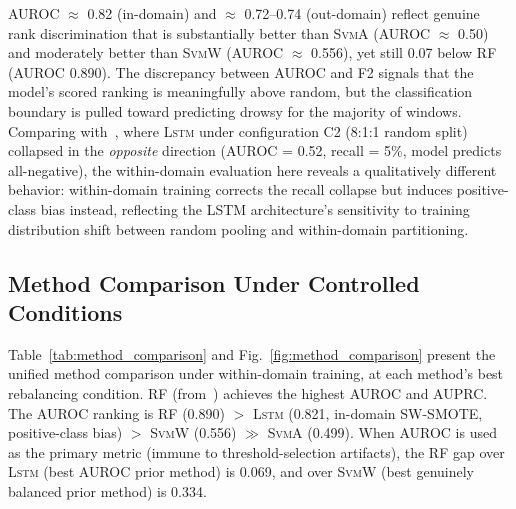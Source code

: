 \documentclass[lettersize,journal]{IEEEtran}
\newcommand{\Impl}[1]{\textsc{#1}}
\begin{document}
AUROC $\approx$ 0.82 (in-domain) and $\approx$ 0.72--0.74 (out-domain) reflect genuine rank discrimination that is substantially better than \Impl{SvmA} (AUROC $\approx$ 0.50) and moderately better than \Impl{SvmW} (AUROC $\approx$ 0.556), yet still 0.07 below RF (AUROC 0.890).
The discrepancy between AUROC and F2 signals that the model's scored ranking is meaningfully above random, but the classification boundary is pulled toward predicting drowsy for the majority of windows.
Comparing with~\cite{nakagama2025iv}, where \Impl{Lstm} under configuration C2 (8:1:1 random split) collapsed in the \emph{opposite} direction (AUROC = 0.52, recall = 5\%, model predicts all-negative), the within-domain evaluation here reveals a qualitatively different behavior: within-domain training corrects the recall collapse but induces positive-class bias instead, reflecting the LSTM architecture's sensitivity to training distribution shift between random pooling and within-domain partitioning.

\subsection{Method Comparison Under Controlled Conditions}
\label{sec:comparison}

Table~\ref{tab:method_comparison} and Fig.~\ref{fig:method_comparison} present the unified method comparison under within-domain training, at each method's best rebalancing condition.
RF (from~\cite{nakagama2026tiv}) achieves the highest AUROC and AUPRC.
The AUROC ranking is RF (0.890) $>$ \Impl{Lstm} (0.821, in-domain SW-SMOTE, positive-class bias) $>$ \Impl{SvmW} (0.556) $\gg$ \Impl{SvmA} (0.499).
When AUROC is used as the primary metric (immune to threshold-selection artifacts), the RF gap over \Impl{Lstm} (best AUROC prior method) is 0.069, and over \Impl{SvmW} (best genuinely balanced prior method) is 0.334.
\end{document}
